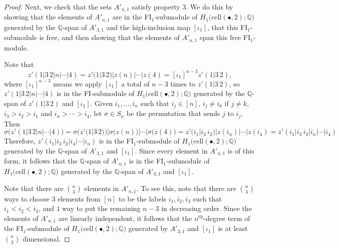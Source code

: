 \documentclass[12py]{amsart}%
\theoremstyle{definition}\newtheorem{definition}[thm]{Definition}
\theoremstyle{definition}
\newcommand{\Q}{\ensuremath{\mathbb{Q}}}
\begin{document}
\begin{proof}
Next, we check that the sets $A'_{n,1}$ satisfy property $3$. We do this by showing that the elements of $A'_{n,1}$ are in the FI$_{1}$-submodule of $H_{1}\big(\text{cell}(\bullet, 2);\Q\big)$ generated by the $\Q$-span of $A'_{3,1}$ and the high-inclusion map $[\iota_{1}]$, that this FI$_{1}$-submodule is free, and then showing that the elements of $A'_{n, 1}$ span this free FI$_{1}$-module.

Note that 
\[
z'(1|3\,2|n|\cdots|4)=z'(1|3\,2)|z(n)|\cdots|z(4)=[\iota_{1}]^{n-3}z'(1|3\,2),
\]
where $[\iota_{1}]^{n-3}$ means we apply $[\iota_{1}]$ a total of $n-3$ times to $z'(1|3\,2)$, so $z'(1|3\,2|n|\cdots|4)$ is in the FI-submodule of $H_{1}\big(\text{cell}(\bullet, 2);\Q\big)$ generated by the $\Q$-span of $z'(1|3\,2)$ and $[\iota_{1}]$. Given $i_{1},\dots, i_{n}$ such that $i_{j}\in [n]$, $i_{j}\neq i_{k}$ if $j\neq k$, $i_{3}>i_{2}>i_{1}$ and $i_{n}>\cdots>i_{4}$, let $\sigma\in S_{n}$ be the permutation that sends $j$ to $i_{j}$. Then
\[
\sigma\big(z'(1|3\,2|n|\cdots|4)\big)=\sigma\big(z'(1|3\,2)\big)|\sigma\big(z(n)\big)|\cdots|\sigma\big(z(4)\big)=z'(i_{1}|i_{3}\,i_{2})|z(i_{n})|\cdots|z(i_{4})=z'(i_{1}|i_{3}\,i_{2}|i_{n}|\cdots|i_{4})
\]
Therefore, $z'(i_{1}|i_{3}\,i_{2}|i_{4}|\cdots|i_{n})$ is in the FI$_{1}$-submodule of $H_{1}\big(\text{cell}(\bullet, 2);\Q\big)$ generated by the $\Q$-span of $A'_{3,1}$ and $[\iota_{1}]$. Since every element in $A'_{n,1}$ is of this form, it follows that the $\Q$-span of $A'_{n,1}$ is in the FI$_{1}$-submodule of $H_{1}\big(\text{cell}(\bullet, 2);\Q\big)$ generated by the $\Q$-span of $A'_{3,1}$ and $[\iota_{1}]$.

Note that there are $\binom{n}{3}$ elements in $A'_{n,1}$. To see this, note that there are $\binom{n}{3}$ ways to choose $3$ elements from $[n]$ to be the labels $i_{1}, i_{2}, i_{3}$ such that $i_{1}<i_{2}<i_{3}$, and $1$ way to put the remaining $n-3$ in decreasing order. Since the elements of $A'_{n,1}$ are linearly independent, it follows that the $n^{\text{th}}$-degree term of the FI$_{1}$-submodule of $H_{1}\big(\text{cell}(\bullet, 2);\Q\big)$ generated by $A'_{3,1}$ and $[\iota_{1}]$ is at least $\binom{n}{3}$ dimensional.


\end{proof}
\end{document}
